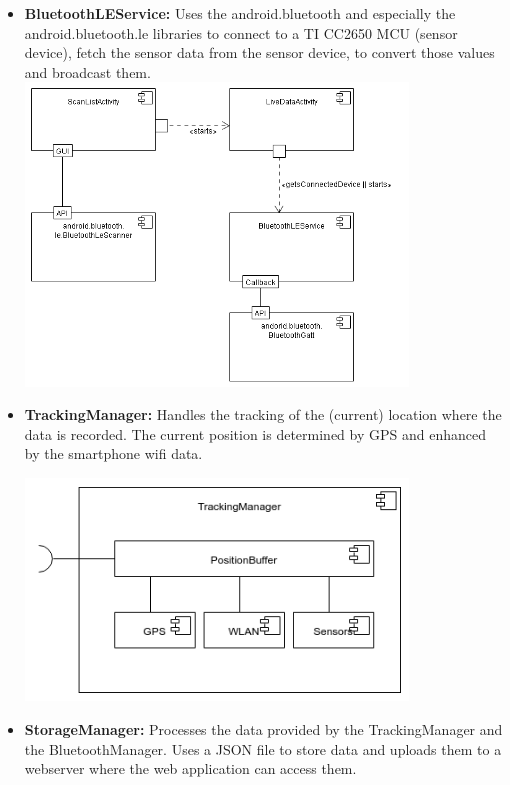 \begin{itemize}
  \item \textbf{BluetoothLEService:} Uses the android.bluetooth and especially the android.bluetooth.le libraries to connect to a TI CC2650 MCU (sensor device), fetch the sensor data from the sensor device, to convert those values and broadcast them. \\

 \includegraphics[width=0.8\textwidth]{pics/ble_man.png}

  \item \textbf{TrackingManager:} Handles the tracking of the (current) location where the data is recorded. The current position is determined by GPS and enhanced by the smartphone wifi data.

 \includegraphics[width=0.8\textwidth]{pics/TrackingManager_Composition.png}

  \item \textbf{StorageManager:} Processes the data provided by the TrackingManager and the BluetoothManager. Uses a JSON file to store data and uploads them to a webserver where the web application can access them.


\end{itemize}
